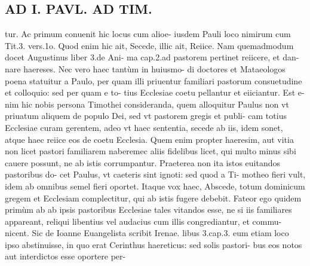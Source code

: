 \documentclass{article}
\begin{document}
\begin{pages}
\section*{AD I. PAVL. AD TIM. }
\marginpar{[ p.430 ]}\pstart tur. Ac primum conuenit hic locus cum alioe- iusdem Pauli loco nimirum cum Tit.3. vers.1o. Quod enim hic ait, Secede, illic ait, Reiice. Nam quemadmodum docet Augustinus liber 3.de Ani- ma cap.2.ad pastorem pertinet reiicere, et dan- nare haereses. Nec vero haec tantùm in huiusmo- di doctores et Mataeologos poena statuitur a Paulo, per quam illi priuentur familiari pastorum consuetudine et colloquio: sed per quam e to- tius Ecclesiae coetu pellantur et eiiciantur. Est e- nim hic nobis persona Timothei consideranda, quem alloquitur Paulus non vt priuatum aliquem de populo Dei, sed vt pastorem gregis et publi- cam totius Ecclesiae curam gerentem, adeo vt haec sententia, secede ab iis, idem sonet, atque haec reiice eos de coetu Ecclesia. Quem enim propter haeresim, aut vitia non licet pastori familiarem naberemec aliis fidelibus licet, qui multo minus sibi cauere possunt, ne ab istis corrumpantur. Praeterea non ita istos euitandos pastoribus do- cet Paulus, vt caeteris sint ignoti: sed quod a Ti- motheo fieri vult, idem ab omnibus semel fieri oportet.  \pend\pstart Itaque vox haec, Abscede, totum dominicum gregem et Ecclesiam complectitur, qui ab istis fugere debebit. Fateor ego quidem primùm ab ab ipsis pastoribus Ecclesiae tales vitandos esse, ne si iis familiares appareant, reliqui libentius vel audacius cum illis congrediantur, et commu- nicent. Sic de Ioanne Euangelista scribit Irenae. libus 3.cap.3. eum etiam loco ipso abstinuisse, in quo erat Cerinthus haereticus: sed solis pastori- bus eos notos aut interdictos esse oportere per-  \pend

\end{pages}
\end{document}
